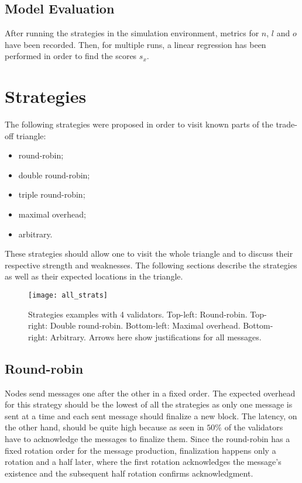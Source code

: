 \subsection{Model Evaluation}
After running the strategies in the simulation environment, metrics for \(n\),
\(l\) and \(o\) have been recorded. Then, for multiple runs, a linear regression
has been performed in order to find the scores \(s_x\).

\section{Strategies}
\label{sec:strategies}

The following strategies were proposed in order to visit known parts of the
trade-off triangle:
\begin{itemize}
        \item round-robin;
        \item double round-robin;
        \item triple round-robin;
        \item maximal overhead;
        \item arbitrary.
\end{itemize}
These strategies should allow one to visit the whole triangle and to discuss
their respective strength and weaknesses. The following sections describe the
strategies as well as their expected locations in the triangle.

\begin{figure}[h]
	\centering
	\texttt{[image: all\_strats]}
    \caption{Strategies examples with 4 validators. Top-left: Round-robin.
    Top-right: Double round-robin. Bottom-left: Maximal overhead. Bottom-right:
    Arbitrary. Arrows here show justifications for all messages.}
	\label{fig:allStrats}
\end{figure}

\subsection{Round-robin}
Nodes send messages one after the other in a fixed order. The expected overhead
for this strategy should be the lowest of all the strategies as only one
message is sent at a time and each sent message should finalize a new block.
The latency, on the other hand, should be quite high because as seen in
 \(50\%\) of the validators have to acknowledge the messages to
finalize them. Since the round-robin has a fixed rotation order for the
message production, finalization happens only a rotation and a half later, where the
first rotation acknowledges the message's existence and the subsequent half rotation confirms acknowledgment.


